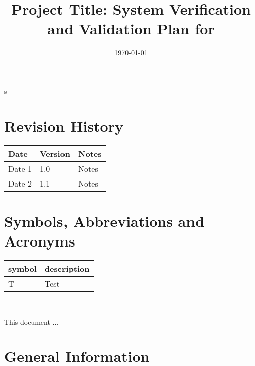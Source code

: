 \documentclass[12pt, titlepage]{article}
\begin{document}
\title{Project Title: System Verification and Validation Plan for \progname{}} 
\author{\authname}
\date{\today}
	
\maketitle
s

\section{Revision History}

\begin{tabularx}{\textwidth}{p{3cm}p{2cm}X}
\toprule {\bf Date} & {\bf Version} & {\bf Notes}\\
\midrule
Date 1 & 1.0 & Notes\\
Date 2 & 1.1 & Notes\\
\bottomrule
\end{tabularx}

\newpage

\tableofcontents

\listoftables
{}

\listoffigures
{}

\newpage

\section{Symbols, Abbreviations and Acronyms}

\renewcommand{\arraystretch}{1.2}
\begin{tabular}{l l} 
  \toprule		
  \textbf{symbol} & \textbf{description}\\
  \midrule 
  T & Test\\
  \bottomrule
\end{tabular}\\


\newpage


This document ... 

\section{General Information}
\end{document}
